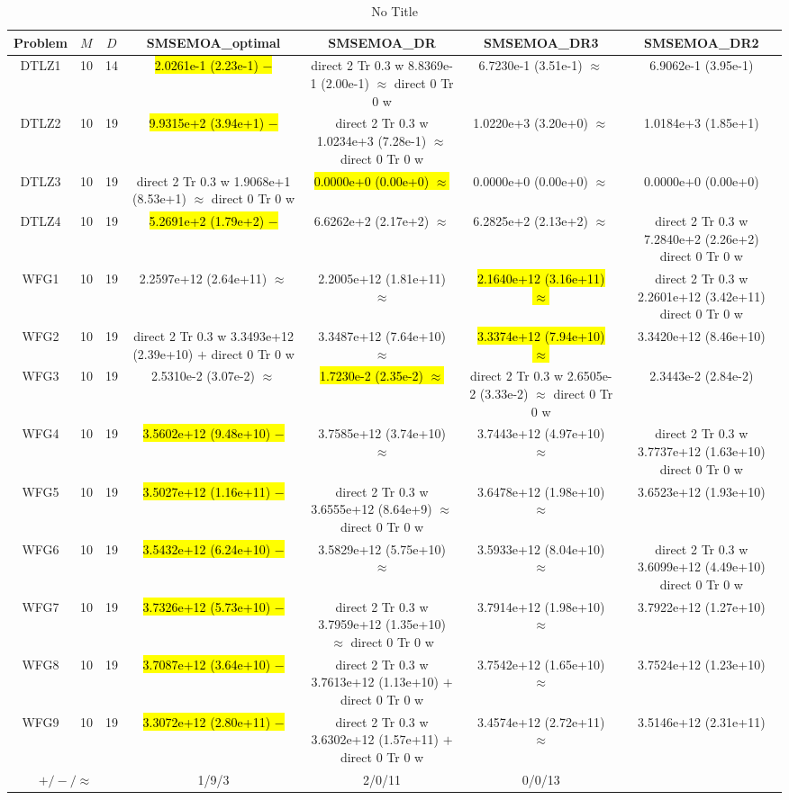 \documentclass[journal]{IEEEtran}
\newcommand{\semitextbf}[1]{%
\pdfliteral direct {2 Tr 0.3 w} %
#1%
\pdfliteral direct {0 Tr 0 w}%
}
\begin{document}
\begin{table*}[htbp]
\renewcommand{\arraystretch}{1.2}
\centering
\caption{No Title}
\begin{tabular}{ccccccc}
\toprule
Problem&$M$&$D$&SMSEMOA\_optimal&SMSEMOA\_DR&SMSEMOA\_DR3&SMSEMOA\_DR2\\
\midrule
\multirow{1}{*}{DTLZ1}&10&14&\hl{2.0261e-1 (2.23e-1) $-$}&\semitextbf{8.8369e-1 (2.00e-1) $\approx$}&6.7230e-1 (3.51e-1) $\approx$&6.9062e-1 (3.95e-1)\\
\hline
\multirow{1}{*}{DTLZ2}&10&19&\hl{9.9315e+2 (3.94e+1) $-$}&\semitextbf{1.0234e+3 (7.28e-1) $\approx$}&1.0220e+3 (3.20e+0) $\approx$&1.0184e+3 (1.85e+1)\\
\hline
\multirow{1}{*}{DTLZ3}&10&19&\semitextbf{1.9068e+1 (8.53e+1) $\approx$}&\hl{0.0000e+0 (0.00e+0) $\approx$}&0.0000e+0 (0.00e+0) $\approx$&0.0000e+0 (0.00e+0)\\
\hline
\multirow{1}{*}{DTLZ4}&10&19&\hl{5.2691e+2 (1.79e+2) $-$}&6.6262e+2 (2.17e+2) $\approx$&6.2825e+2 (2.13e+2) $\approx$&\semitextbf{7.2840e+2 (2.26e+2)}\\
\hline
\multirow{1}{*}{WFG1}&10&19&2.2597e+12 (2.64e+11) $\approx$&2.2005e+12 (1.81e+11) $\approx$&\hl{2.1640e+12 (3.16e+11) $\approx$}&\semitextbf{2.2601e+12 (3.42e+11)}\\
\hline
\multirow{1}{*}{WFG2}&10&19&\semitextbf{3.3493e+12 (2.39e+10) $+$}&3.3487e+12 (7.64e+10) $\approx$&\hl{3.3374e+12 (7.94e+10) $\approx$}&3.3420e+12 (8.46e+10)\\
\hline
\multirow{1}{*}{WFG3}&10&19&2.5310e-2 (3.07e-2) $\approx$&\hl{1.7230e-2 (2.35e-2) $\approx$}&\semitextbf{2.6505e-2 (3.33e-2) $\approx$}&2.3443e-2 (2.84e-2)\\
\hline
\multirow{1}{*}{WFG4}&10&19&\hl{3.5602e+12 (9.48e+10) $-$}&3.7585e+12 (3.74e+10) $\approx$&3.7443e+12 (4.97e+10) $\approx$&\semitextbf{3.7737e+12 (1.63e+10)}\\
\hline
\multirow{1}{*}{WFG5}&10&19&\hl{3.5027e+12 (1.16e+11) $-$}&\semitextbf{3.6555e+12 (8.64e+9) $\approx$}&3.6478e+12 (1.98e+10) $\approx$&3.6523e+12 (1.93e+10)\\
\hline
\multirow{1}{*}{WFG6}&10&19&\hl{3.5432e+12 (6.24e+10) $-$}&3.5829e+12 (5.75e+10) $\approx$&3.5933e+12 (8.04e+10) $\approx$&\semitextbf{3.6099e+12 (4.49e+10)}\\
\hline
\multirow{1}{*}{WFG7}&10&19&\hl{3.7326e+12 (5.73e+10) $-$}&\semitextbf{3.7959e+12 (1.35e+10) $\approx$}&3.7914e+12 (1.98e+10) $\approx$&3.7922e+12 (1.27e+10)\\
\hline
\multirow{1}{*}{WFG8}&10&19&\hl{3.7087e+12 (3.64e+10) $-$}&\semitextbf{3.7613e+12 (1.13e+10) $+$}&3.7542e+12 (1.65e+10) $\approx$&3.7524e+12 (1.23e+10)\\
\hline
\multirow{1}{*}{WFG9}&10&19&\hl{3.3072e+12 (2.80e+11) $-$}&\semitextbf{3.6302e+12 (1.57e+11) $+$}&3.4574e+12 (2.72e+11) $\approx$&3.5146e+12 (2.31e+11)\\
\hline
\multicolumn{3}{c}{$+/-/\approx$}&1/9/3&2/0/11&0/0/13&\\
\bottomrule
\end{tabular}
\label{No Label}
\end{table*}
\end{document}
